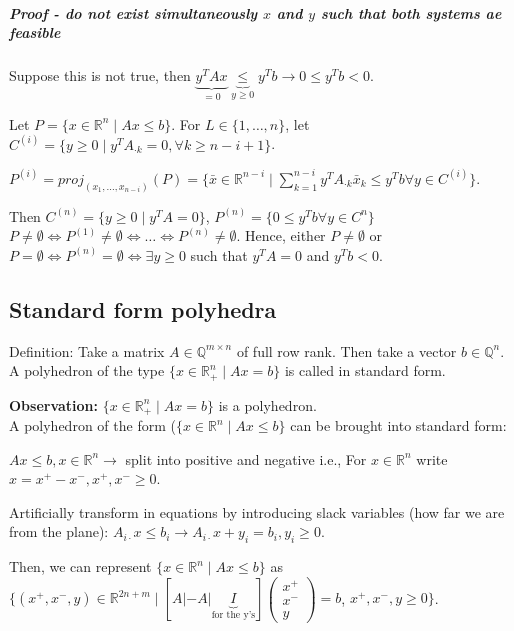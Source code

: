 \documentclass[main]{subfiles}
\begin{document}
\subparagraph{Proof - do not exist simultaneously $x$ and $y$ such that both 
systems ae feasible}

Suppose this is not true, then $\underbrace{y^T Ax}_{=0}
\underbrace{\leq}_{y \geq 0} y^T b \rightarrow 0 \leq y^T b < 0$. 

Let $P = \{x \in \mathbb{R}^n \mid Ax \leq b \}$. For $L \in \{1, \dots, n \}$,
let $C^{(i)} = \{ y \geq 0 \mid y^T A_{\cdot k} = 0, \forall k \geq n-i+1 \}$.

$P^{(i)} = proj_{(x_1, \dots, x_{n-i})}(P) = \{ \bar{x} \in \mathbb{R}^{n-i}
\mid \sum_{k=1}^{n-i}y^T A_{\cdot k} \bar{x}_k \leq y^T b \forall y \in C^{(i)}
\}$.

Then $C^{(n)} = \{y \geq 0 \mid y^T A = 0 \}$, $P^{(n)} = \{0 \leq y^Tb
\forall y \in C^n \}$
$P \neq \emptyset \iff P^{(1)} \neq \emptyset \iff \dots \iff P^{(n)} \neq
\emptyset$.
Hence, either $P \neq \emptyset$ or $P = \emptyset \iff P^{(n)} = \emptyset
\iff \exists y \geq 0$ such that $y^T A = 0$ and $y^T b < 0$.

\subsection{Standard form polyhedra}
Definition: Take a matrix $A \in \mathbb{Q}^{m \times n}$ of full row rank. 
Then take a vector $b \in \mathbb{Q}^n$. A polyhedron of the type $\{x \in 
\mathbb{R}^n_+ \mid Ax = b \}$ is called in standard form.

\textbf{Observation:} $\{x\in \mathbb{R}^n_+ \mid Ax = b \}$ is a polyhedron.\\

A polyhedron of the form ($\{x \in \mathbb{R}^n \mid Ax \leq b \}$ can be
brought into standard form:

$Ax \leq b, x \in \mathbb{R}^n \rightarrow$ split into positive and negative 
i.e., For $x \in \mathbb{R}^n$ write $x = x^+ - x^-, x^+, x^- \geq 0$.

Artificially transform in equations by introducing slack variables (how far we
are from the plane): $A_{i\cdot} x \leq b_i \rightarrow A_{i\cdot}x + y_i =
b_i, y_i \geq 0$.

Then, we can represent $\{ x \in \mathbb{R}^n \mid Ax \leq b \}$ as $\{(x^+,
x^-, y) \in \mathbb{R}^{2n+m} \mid [A | -A | \underbrace{I}_{\text{for the
y's}}]\begin{pmatrix} x^+ \\ x^- \\ y \end{pmatrix} = b$, $x^+, x^-, y \geq 0
\}$.
\end{document}
